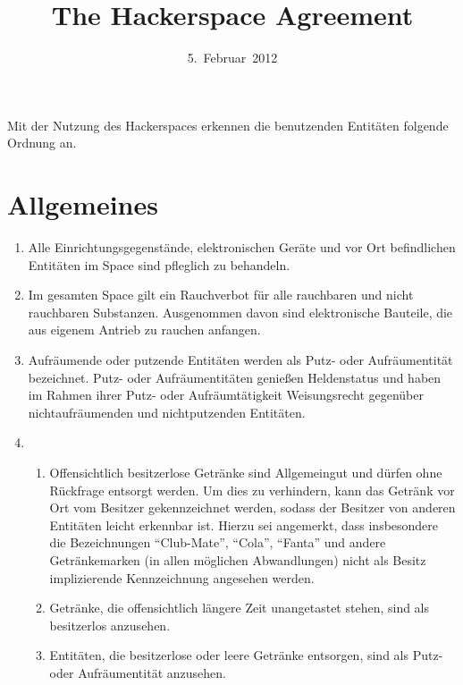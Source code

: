 \documentclass[12pt,a4paper]{scrartcl}
\title{The Hackerspace Agreement}
\date{5.~Februar~2012}
\begin{document}
\maketitle

\noindent Mit der Nutzung des Hackerspaces erkennen die benutzenden Entitäten
folgende Ordnung an.

\section{Allgemeines}
\begin{enumerate}
  \item Alle Einrichtungsgegenstände, elektronischen Geräte und vor Ort
    befindlichen Entitäten im Space sind pfleglich zu behandeln.

  \item Im gesamten Space gilt ein Rauchverbot für alle rauchbaren und nicht
    rauchbaren Substanzen. Ausgenommen davon sind elektronische Bauteile, die
    aus eigenem Antrieb zu rauchen anfangen.

  \item Aufräumende oder putzende Entitäten werden als Putz- oder Aufräumentität
    bezeichnet. Putz- oder Aufräumentitäten genießen Heldenstatus und haben im
    Rahmen ihrer Putz- oder Aufräumtätigkeit Weisungsrecht gegenüber
    nichtaufräumenden und nichtputzenden Entitäten.

  \item\begin{enumerate}
    \item Offensichtlich besitzerlose Getränke sind Allgemeingut und dürfen ohne
      Rückfrage entsorgt werden. Um dies zu verhindern, kann das Getränk vor Ort
      vom Besitzer gekennzeichnet werden, sodass der Besitzer von anderen
      Entitäten leicht erkennbar ist. Hierzu sei angemerkt, dass insbesondere
      die Bezeichnungen "`Club-Mate"', "`Cola"', "`Fanta"' und andere
      Getränkemarken (in allen möglichen Abwandlungen) nicht als Besitz
      implizierende Kennzeichnung angesehen werden.
    \item Getränke, die offensichtlich längere Zeit unangetastet stehen, sind
      als besitzerlos anzusehen.
    \item Entitäten, die besitzerlose oder leere Getränke entsorgen, sind als
      Putz- oder Aufräumentität anzusehen.
  \end{enumerate}


\end{enumerate}
\end{document}

